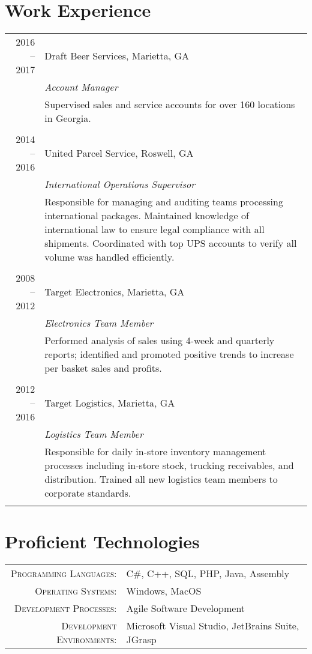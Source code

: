 \documentclass[a4paper,10pt]{article}
\begin{document}
\section{Work Experience}
\begin{tabular}{r|p{11cm}}

  \textsc{2016 -- 2017} &Draft Beer Services, Marietta, GA \\&\emph{Account Manager}\\&\footnotesize{Supervised sales and service accounts for over 160 locations in Georgia.}\\\multicolumn{2}{c}{} \\
 
 \textsc{2014 -- 2016} &United Parcel Service, Roswell, GA \\&\emph{International Operations Supervisor}\\&\footnotesize{Responsible for managing and auditing teams processing international packages. Maintained knowledge of international law to ensure legal compliance with all shipments. Coordinated with top UPS accounts to verify all volume was handled efficiently.}\\\multicolumn{2}{c}{} \\
 
\textsc{2008 -- 2012} & Target Electronics, Marietta, GA \\&\emph{Electronics Team Member}\\&\footnotesize{Performed analysis of sales using 4-week and quarterly reports; identified and promoted positive trends to increase per basket sales and profits.}\\\multicolumn{2}{c}{}\\

\textsc{2012 -- 2016} & Target Logistics, Marietta, GA \\&\emph{Logistics Team Member}\\&\footnotesize{Responsible for daily in-store inventory management processes including in-store stock, trucking receivables, and distribution. Trained all new logistics team members to corporate standards.}\\\multicolumn{2}{c}{}\\
\end{tabular}

\section{Proficient Technologies}
\begin{tabular}{rl}
\textsc{Programming Languages:}&C\#, C++, SQL, PHP, Java, Assembly\\
\textsc{Operating Systems:}&Windows, MacOS\\
\textsc{Development Processes:}&Agile Software Development\\
\textsc{Development Environments:}&Microsoft Visual Studio, JetBrains Suite, JGrasp
\end{tabular}
\end{document}
